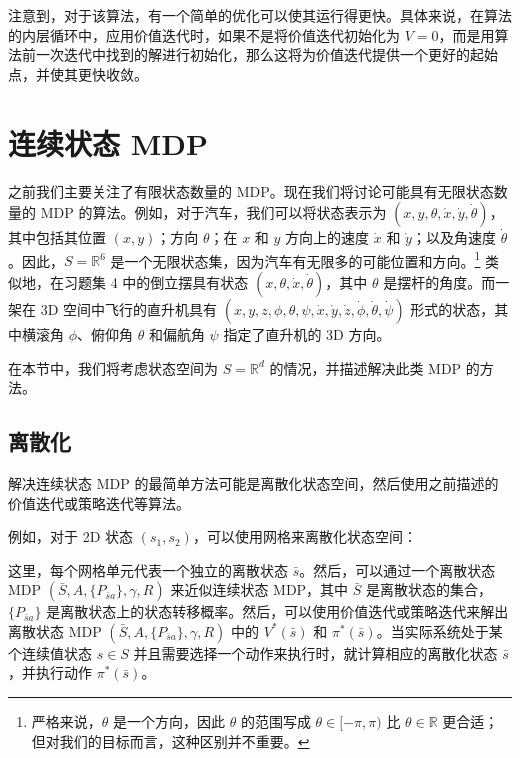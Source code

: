 注意到，对于该算法，有一个简单的优化可以使其运行得更快。具体来说，在算法的内层循环中，应用价值迭代时，如果不是将价值迭代初始化为 $V=0$，而是用算法前一次迭代中找到的解进行初始化，那么这将为价值迭代提供一个更好的起始点，并使其更快收敛。

\section{连续状态 MDP}

之前我们主要关注了有限状态数量的 MDP。现在我们将讨论可能具有无限状态数量的 MDP 的算法。例如，对于汽车，我们可以将状态表示为 $(x, y, \theta, \dot{x}, \dot{y}, \dot{\theta})$，其中包括其位置 $(x, y)$；方向 $\theta$；在 $x$ 和 $y$ 方向上的速度 $\dot{x}$ 和 $\dot{y}$；以及角速度 $\dot{\theta}$。因此，$S = \mathbb{R}^6$ 是一个无限状态集，因为汽车有无限多的可能位置和方向。\footnote{严格来说，$\theta$ 是一个方向，因此 $\theta$ 的范围写成 $\theta \in [-\pi, \pi)$ 比 $\theta \in \mathbb{R}$ 更合适；但对我们的目标而言，这种区别并不重要。} 类似地，在习题集 4 中的倒立摆具有状态 $(x, \theta, \dot{x}, \dot{\theta})$，其中 $\theta$ 是摆杆的角度。而一架在 3D 空间中飞行的直升机具有 $(x, y, z, \phi, \theta, \psi, \dot{x}, \dot{y}, \dot{z}, \dot{\phi}, \dot{\theta}, \dot{\psi})$ 形式的状态，其中横滚角 $\phi$、俯仰角 $\theta$ 和偏航角 $\psi$ 指定了直升机的 3D 方向。

在本节中，我们将考虑状态空间为 $S = \mathbb{R}^d$ 的情况，并描述解决此类 MDP 的方法。

\subsection{离散化}

解决连续状态 MDP 的最简单方法可能是离散化状态空间，然后使用之前描述的价值迭代或策略迭代等算法。

例如，对于 2D 状态 $(s_1, s_2)$，可以使用网格来离散化状态空间：

\begin{figure}[H]
    \centering
\end{figure}

这里，每个网格单元代表一个独立的离散状态 $\bar{s}$。然后，可以通过一个离散状态 MDP $(\bar{S}, A, \{P_{\bar{s}a}\}, \gamma, R)$ 来近似连续状态 MDP，其中 $\bar{S}$ 是离散状态的集合，$\{P_{\bar{s}a}\}$ 是离散状态上的状态转移概率。然后，可以使用价值迭代或策略迭代来解出离散状态 MDP $(\bar{S}, A, \{P_{\bar{s}a}\}, \gamma, R)$ 中的 $V^*(\bar{s})$ 和 $\pi^*(\bar{s})$。当实际系统处于某个连续值状态 $s \in S$ 并且需要选择一个动作来执行时，就计算相应的离散化状态 $\bar{s}$，并执行动作 $\pi^*(\bar{s})$。

